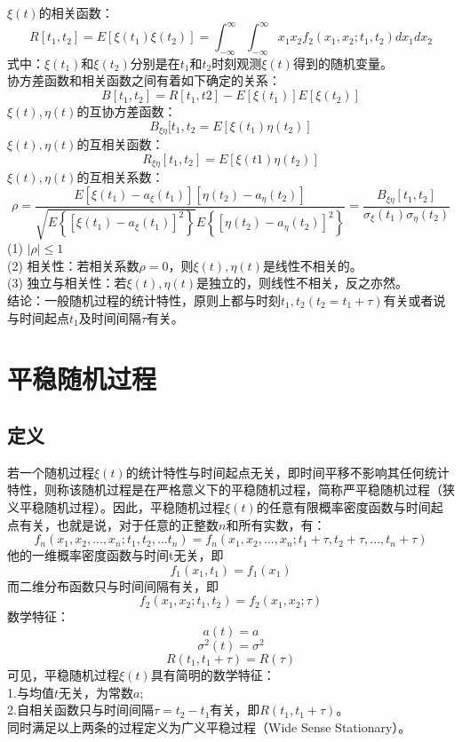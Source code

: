 \documentclass[12pt,a4paper,oneside]{ctexart}
\begin{document}
\indent $\xi(t)$的相关函数：
$$
R[t_{1},t_{2}] = E[\xi(t_{1})\xi(t_{2})] = \int_{-\infty}^{\infty}\int_{-\infty}^{\infty}x_{1}x_{2}f_{2}(x_{1},x_{2};t_{1},t_{2})dx_{1}dx_{2}
$$
\indent 式中：$\xi(t_{1})$和$\xi(t_{2})$分别是在$t_{1}$和$t_{2}$时刻观测$\xi(t)$得到的随机变量。\\
\indent 协方差函数和相关函数之间有着如下确定的关系：
$$
B[t_{1},t_{2}] = R[t_{1},t{2}] - E[\xi(t_{1})]E[\xi(t_{2})]
$$
\indent $\xi(t),\eta(t)$的互协方差函数：
$$
B_{\xi\eta}[t_{1},t_{2} = E[\xi(t_{1})\eta(t_{2})]
$$
\indent $\xi(t),\eta(t)$的互相关函数：
$$
R_{\xi\eta}[t_{1},t_{2}] = E[\xi(t1)\eta(t_{2})]
$$
\indent $\xi(t),\eta(t)$的互相关系数：
$$
\rho = \frac{E[\xi(t_{1}) - a_{\xi}(t_{1})][\eta(t_{2}) - a_{\eta}(t_{2})]}{\sqrt{E\left\{[\xi(t_{1}) - a_{\xi}(t_{1})]^{2}\right\}}E\left\{[\eta(t_{2}) - a_{\eta}(t_{2})]^{2}\right\}} = \frac{B_{\xi\eta}[t_{1},t_{2}]}{\sigma_{\xi}(t_{1})\sigma_{\eta}(t_{2})}
$$
\indent (1) $|\rho|\le 1$\\
\indent (2) 相关性：若相关系数$\rho = 0$，则$\xi(t),\eta(t)$是线性不相关的。\\
\indent (3) 独立与相关性：若$\xi(t),\eta(t)$是独立的，则线性不相关，反之亦然。\\
\indent 结论：一般随机过程的统计特性，原则上都与时刻$t_{1},t_{2}(t_{2} = t_{1} + \tau)$有关或者说与时间起点$t_{1}$及时间间隔$\tau$有关。
\section{平稳随机过程}
\subsection{定义}
若一个随机过程$\xi(t)$的统计特性与时间起点无关，即时间平移不影响其任何统计特性，则称该随机过程是在严格意义下的平稳随机过程，简称严平稳随机过程（狭义平稳随机过程）。因此，平稳随机过程$\xi(t)$的任意有限概率密度函数与时间起点有关，也就是说，对于任意的正整数$n$和所有实数，有：
$$
f_{n}(x_{1},x_{2},...,x_{n};t_{1},t_{2},...t_{n}) = f_{n}(x_{1},x_{2},...,x_{n};t_{1} + \tau, t_{2} + \tau,...,t_{n} + \tau)
$$
他的一维概率密度函数与时间t无关，即
$$
    f_{1}(x_{1},t_{1}) = f_{1}(x_{1})
$$
而二维分布函数只与时间间隔有关，即
$$
    f_{2}(x_{1},x_{2};t_{1},t_{2}) = f_{2}(x_{1},x_{2};\tau)
$$
数学特征：
$$
    a(t) = a
$$
$$
    \sigma^{2}(t) = \sigma^{2}
$$
$$
    R(t_{1},t_{1} + \tau) = R(\tau)
$$
可见，平稳随机过程$\xi(t)$具有简明的数学特征：\\
1.与均值$t$无关，为常数$a$;\\
2.自相关函数只与时间间隔$\tau = t_{2} - t_{1}$有关，即$R(t_{1},t_{1} + \tau)$。\\
同时满足以上两条的过程定义为广义平稳过程（Wide Sense Stationary）。
\end{document}
